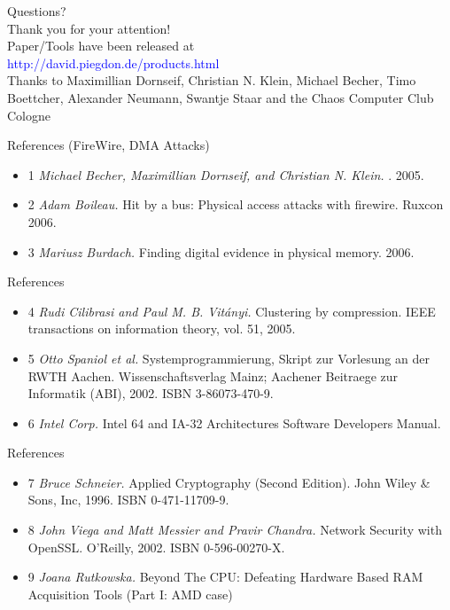 \documentclass{beamer}
\newenvironment{itemizeframe}[1]
  {\begin{frame}{#1}\startitemizeframe}
  {\stopitemizeframe\end{frame}}
\newcommand\startitemizeframe{\begin{itemize}}
\newcommand\stopitemizeframe{\end{itemize}}
\begin{document}
	\begin{frame}
		\begin{center}
			\Large
			Questions? \\[1.5ex]
			
			Thank you for your attention! \\[1.5ex]
			
			\small
			Paper/Tools have been released at \\
			\textcolor{blue}{http://david.piegdon.de/products.html}
			\\[1.5ex]

			\tiny
			Thanks to Maximillian Dornseif, Christian N. Klein, Michael Becher, Timo Boettcher, Alexander Neumann, Swantje Staar and the Chaos Computer Club Cologne
		\end{center}
	\end{frame}

	\begin{itemizeframe}{References (FireWire, DMA Attacks)}
		\item[1] \emph{Michael Becher, Maximillian Dornseif, and Christian N.
			Klein.} . 2005.

		\item[2] \emph{Adam Boileau.} Hit by a bus: Physical access attacks with
			firewire. Ruxcon 2006.

		\item[3] \emph{Mariusz Burdach.} Finding digital evidence in physical memory. 2006.
	\end{itemizeframe}

	\begin{itemizeframe}{References}
		\item[4] \emph{Rudi Cilibrasi and Paul M. B. Vit\'anyi.} Clustering by compression.
			IEEE transactions on information theory, vol. 51, 2005.

		\item[5] \emph{Otto Spaniol et al.} Systemprogrammierung, Skript zur Vorlesung an der RWTH
			Aachen. Wissenschaftsverlag Mainz; Aachener Beitraege zur Informatik (ABI),
			2002. ISBN 3-86073-470-9.
			
		\item[6] \emph{Intel Corp.} Intel 64 and IA-32 Architectures Software Developers Manual.
	\end{itemizeframe}

	\begin{itemizeframe}{References}
		\item[7] \emph{Bruce Schneier.} Applied Cryptography (Second Edition). John Wiley \& Sons,
			Inc, 1996. ISBN 0-471-11709-9.
		\item[8] \emph{John Viega and Matt Messier and Pravir Chandra.} Network Security with
			OpenSSL. O'Reilly, 2002. ISBN 0-596-00270-X.
		\item[9] \emph{Joana Rutkowska.} Beyond The CPU: Defeating Hardware Based RAM Acquisition Tools (Part I: AMD case)
	\end{itemizeframe}
\end{document}
